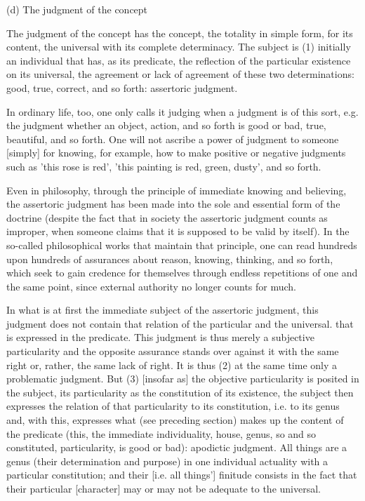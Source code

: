 (d) The judgment of the concept

The judgment of the concept has the concept,
the totality in simple form, for its content,
the universal with its complete determinacy.
The subject is (1) initially an individual
that has, as its predicate, the reflection of
the particular existence on its universal,
the agreement or lack of agreement
of these two determinations:
good, true, correct, and so forth:
assertoric judgment.

In ordinary life, too, one only calls it judging
when a judgment is of this sort, e.g.
the judgment whether an object, action, and so forth is
good or bad, true, beautiful, and so forth.
One will not ascribe a power of judgment to someone [simply]
for knowing, for example, how to make positive or negative judgments
such as 'this rose is red', 'this painting is red, green, dusty',
and so forth.

Even in philosophy, through the principle of
immediate knowing and believing,
the assertoric judgment has been made into
the sole and essential form of the doctrine
(despite the fact that in society the
assertoric judgment counts as improper,
when someone claims that it is supposed
to be valid by itself).
In the so-called philosophical works
that maintain that principle,
one can read hundreds upon hundreds of
assurances about reason, knowing, thinking,
and so forth, which seek to gain credence for themselves
through endless repetitions of one and the same point,
since external authority no longer counts for much.

In what is at first the immediate subject
of the assertoric judgment,
this judgment does not contain that relation
of the particular and the universal.
that is expressed in the predicate.
This judgment is thus merely a subjective particularity
and the opposite assurance stands over against it
with the same right or, rather, the same lack of right.
It is thus (2) at the same time only a problematic judgment.
But (3) [insofar as] the objective particularity
is posited in the subject,
its particularity as the constitution of its existence,
the subject then expresses the relation of
that particularity to its constitution,
i.e. to its genus and, with this,
expresses what (see preceding section)
makes up the content of the predicate
(this, the immediate individuality, house, genus,
so and so constituted, particularity, is good or bad):
apodictic judgment.
All things are a genus (their determination and purpose)
in one individual actuality with a particular constitution;
and their [i.e. all things'] finitude consists in the fact that
their particular [character] may or may not be adequate to the universal.


